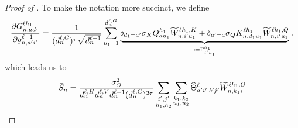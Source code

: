 \begin{proof}[Proof of ]
    To make the notation more succinct, we define
    \begin{align}\label{eq:vv_grad_logit_summand}
        \frac{
            \partial 
            G_{n, a d_1}^{\ell h_1}
        }{
            \partial g_{n, a' i'}^{\ell - 1}
        }
        =
        \frac{1}{(d_{n}^{\ell, G})^{\tau} \sqrt{d_{n}^{\ell - 1}}}
                \sum_{u_1 = 1}^{d_{n}^{\ell, G}}
                    \underbrace{
                        \delta_{d_1 = a'}
                        \sigma_{K}
                        Q_{a u_1}^{h_1}
                            \widetilde{W}_{n, i' u_1}^{\ell h_1 , K}
                        +
                        \delta_{a' = a}
                        \sigma_{Q}
                        K_{n, d_1 u_1}^{\ell h_1}
                            \widetilde{W}_{n, i' u_1}^{\ell h_1 , Q}
                    }_{\coloneqq \Gamma_{i' u_1}^{h_1}}
        \, .
    \end{align}
    which leads us to
    \begin{align*}
        \generalMean_{\sequenceVariable}
        =
        \frac{\outVar}{\headDimension \valueDimension \layerDimension{\depthSymbol - 1} (\logitDimension)^{2\scaling}}
        \sum_{\substack{\gIndexZA, \gIndexZB \\ \headIndex_1, \headIndex_2}}
        \sum_{\substack{k_1, k_2 \\ u_1 , u_2}}
            \ntkhat_{
                \gIndexA \gIndexZA , \gIndexB \gIndexZB
            }^{\depthSymbol}
            \uW_{\sequenceVariable , k_1 i}^{\depthSymbol \headIndex_1 , \outputSymbol}

\end{align*}
\end{proof}
